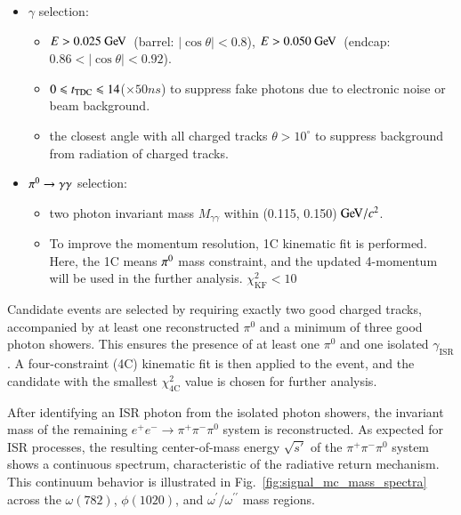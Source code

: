 \begin{itemize}
    \item $\gamma$ selection:
          \begin{itemize}
              \item $E>0.025\gev$~(barrel: $|\cos\theta|<0.8$), $E>0.050\gev$~(endcap: $0.86<|\cos\theta|<0.92$).
              \item $0\leqslant t_{\rm TDC} \leqslant 14$($\times 50 \unit{ns}$) to suppress fake photons due to electronic noise or beam background.
              \item the closest angle with all charged tracks $\theta>10^{\circ}$ to suppress background from radiation of charged tracks.
          \end{itemize}
    \item $\pi^{0} \rightarrow \gamma\gamma$ selection:
          \begin{itemize}
              \item two photon invariant mass $M_{\gamma\gamma}$ within (0.115, 0.150)$\gevcc$.
              \item To improve the momentum resolution, 1C kinematic fit is performed. Here, the 1C means $\pi^{0}$ mass constraint, and the updated 4-momentum will be used in the further analysis. $\chi^2_{\mathrm{KF}}<10$
          \end{itemize}
\end{itemize}

Candidate events are selected by requiring exactly two good charged tracks, accompanied by at least one reconstructed $\pi^0$ and a minimum of three good photon showers. This ensures the presence of at least one $\pi^0$ and one isolated $\gamma_{\mathrm{ISR}}$. A four-constraint (4C) kinematic fit is then applied to the event, and the candidate with the smallest $\chi_{\mathrm{4C}}^2$ value is chosen for further analysis.

After identifying an ISR photon from the isolated photon showers, the invariant mass of the remaining $e^+e^- \to \pi^+\pi^-\pi^0$ system is reconstructed. As expected for ISR processes, the resulting center-of-mass energy $\sqrt{s'}$ of the $\pi^+\pi^-\pi^0$ system shows a continuous spectrum, characteristic of the radiative return mechanism. This continuum behavior is illustrated in Fig.~\ref{fig:signal_mc_mass_spectra} across the $\omega(782)$, $\phi(1020)$, and $\omega^{\prime}/\omega^{\prime\prime}$ mass regions.

